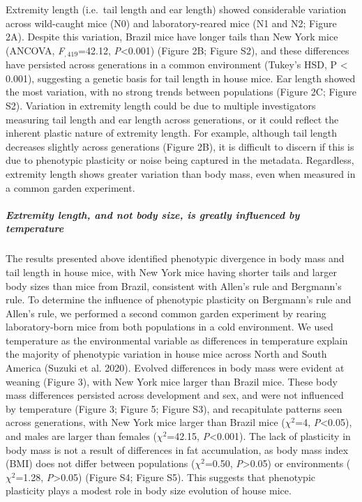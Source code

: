 \documentclass[]{article}
\let\oldsubparagraph\subparagraph
\renewcommand{\subparagraph}[1]{\oldsubparagraph{#1}\mbox{}}
\begin{document}
Extremity length (i.e.~tail length and ear length) showed considerable
variation across wild-caught mice (N0) and laboratory-reared mice (N1
and N2; Figure 2A). Despite this variation, Brazil mice have longer
tails than New York mice (ANCOVA, \emph{F}\(_{,419}\)=42.12,
\emph{P}\textless{}0.001) (Figure 2B; Figure S2), and these differences
have persisted across generations in a common environment (Tukey's HSD,
P \textless{} 0.001), suggesting a genetic basis for tail length in
house mice. Ear length showed the most variation, with no strong trends
between populations (Figure 2C; Figure S2). Variation in extremity
length could be due to multiple investigators measuring tail length and
ear length across generations, or it could reflect the inherent plastic
nature of extremity length. For example, although tail length decreases
slightly across generations (Figure 2B), it is difficult to discern if
this is due to phenotypic plasticity or noise being captured in the
metadata. Regardless, extremity length shows greater variation than body
mass, even when measured in a common garden experiment.

\hypertarget{extremity-length-and-not-body-size-is-greatly-influenced-by-temperature}{%
\subparagraph{\texorpdfstring{\emph{Extremity length, and not body size,
is greatly influenced by
temperature}}{Extremity length, and not body size, is greatly influenced by temperature}}\label{extremity-length-and-not-body-size-is-greatly-influenced-by-temperature}}

The results presented above identified phenotypic divergence in body
mass and tail length in house mice, with New York mice having shorter
tails and larger body sizes than mice from Brazil, consistent with
Allen's rule and Bergmann's rule. To determine the influence of
phenotypic plasticity on Bergmann's rule and Allen's rule, we performed
a second common garden experiment by rearing laboratory-born mice from
both populations in a cold environment. We used temperature as the
environmental variable as differences in temperature explain the
majority of phenotypic variation in house mice across North and South
America (Suzuki et al. 2020). Evolved differences in body mass were
evident at weaning (Figure 3), with New York mice larger than Brazil
mice. These body mass differences persisted across development and sex,
and were not influenced by temperature (Figure 3; Figure 5; Figure S3),
and recapitulate patterns seen across generations, with New York mice
larger than Brazil mice (\(\chi^2\)=4, \emph{P}\textless{}0.05), and
males are larger than females (\(\chi^2\)=42.15,
\emph{P}\textless{}0.001). The lack of plasticity in body mass is not a
result of differences in fat accumulation, as body mass index (BMI) does
not differ between populations (\(\chi^2\)=0.50,
\emph{P}\textgreater{}0.05) or environments (\(\chi^2\)=1.28,
\emph{P}\textgreater{}0.05) (Figure S4; Figure S5). This suggests that
phenotypic plasticity plays a modest role in body size evolution of
house mice.
\end{document}
